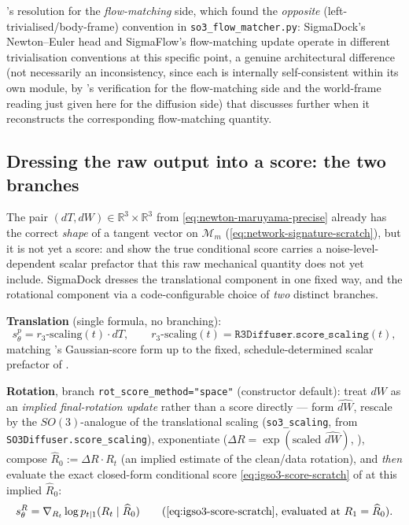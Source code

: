 \documentclass[11pt,a4paper]{report}
\theoremstyle{definition}
\theoremstyle{remark}
\newcommand{\RR}{\mathbb R}
\newcommand{\pyfunc}[1]{\texttt{#1}}
\begin{document}
\begin{codebox}
's resolution for the \emph{flow-matching}
side, which found the \emph{opposite} (left-trivialised/body-frame)
convention in \pyfunc{so3\_flow\_matcher.py}: SigmaDock's Newton--Euler
head and SigmaFlow's flow-matching update operate in different
trivialisation conventions at this specific point, a genuine architectural
difference (not necessarily an inconsistency, since each is internally
self-consistent within its own module, by 's
verification for the flow-matching side and the world-frame reading just
given here for the diffusion side) that  discusses
further when it reconstructs the corresponding flow-matching quantity.
\end{codebox}

\subsection{Dressing the raw output into a score: the two branches}
\label{sec:sd-head-branches}

The pair $(dT,dW)\in\RR^3\times\RR^3$ from
\eqref{eq:newton-maruyama-precise} already has the correct \emph{shape} of
a tangent vector on $\mathcal M_m$ (\eqref{eq:network-signature-scratch}),
but it is not yet a score:  and
 show the true conditional score carries a
noise-level-dependent scalar prefactor that this raw mechanical quantity
does not yet include. SigmaDock dresses the translational component in one
fixed way, and the rotational component via a code-configurable choice of
\emph{two} distinct branches.

\textbf{Translation} (single formula, no branching):
\begin{equation}
\label{eq:sd-head-precise}
s^p_\theta = r_3\text{-}\mathrm{scaling}(t)\cdot dT,
\qquad
r_3\text{-}\mathrm{scaling}(t) = \texttt{R3Diffuser.score\_scaling}(t) ,
\end{equation}
matching 's Gaussian-score form up to the fixed,
schedule-determined scalar prefactor of .

\textbf{Rotation}, branch \texttt{rot\_score\_method="space"} (constructor
default): treat $dW$ as an \emph{implied final-rotation update} rather than
a score directly --- form $\widehat{dW}$, rescale by the $SO(3)$-analogue
of the translational scaling (\texttt{so3\_scaling}, from
\pyfunc{SO3Diffuser.score\_scaling}), exponentiate
($\Delta R=\exp(\text{scaled }\widehat{dW})$, ),
compose $\widehat R_0 := \Delta R\cdot R_t$ (an implied estimate of the
clean/data rotation), and \emph{then} evaluate the exact closed-form
conditional score \eqref{eq:igso3-score-scratch} of
 at this implied $\widehat R_0$:
\begin{equation}
\label{eq:sd-head-rot-space}
s^R_\theta = \nabla_{R_t}\log p_{t\mid1}(R_t\mid\widehat R_0)
\qquad\text{(\Cref{eq:igso3-score-scratch}, evaluated at }R_1=\widehat R_0\text{).}
\end{equation}
\end{document}
